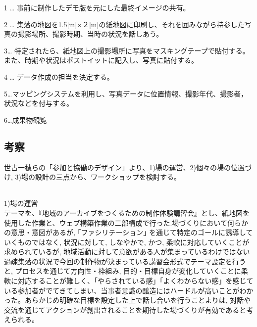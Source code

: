 \documentclass[a4paper]{jsarticle}
\begin{document}
\item 1 … 事前に制作したデモ版を元にした最終イメージの共有。
\item 2 … 集落の地図を1.5[m]×２[m]の紙地図に印刷し、それを囲みながら持参した写真の撮影場所、撮影時期、当時の状況を話しあう。


\item 3… 特定されたら、紙地図上の撮影場所に写真をマスキングテープで貼付する。また、時期や状況はポストイットに記入し、写真に貼付する。

\item 4 … データ作成の担当を決定する。

\item 5…マッピングシステムを利用し、写真データに位置情報、撮影年代、撮影者，状況などを付与する。
\item 6…成果物観覧
\subsection{考察}
世古一穂らの「参加と協働のデザイン」より、1)場の運営、2)個々の場の位置づけ, 3)場の設計の三点から、ワークショップを検討する。\\\\
\item 1)場の運営\\
テーマを、『地域のアーカイブをつくるための制作体験講習会』とし、紙地図を使用した作業と、ウェブ構築作業の二部構成で行った.場づくりにおいて何らかの意思・意図があるが, ｢ファシリテーション｣ を通じて特定のゴールに誘導していくものではなく, 状況に対して, しなやかで, かつ, 柔軟に対応していくことが求められているが, 地域活動に対して意欲がある人が集まっているわけではない過疎集落の状況で今回の制作物が決まっている講習会形式でテーマ設定を行うと,  プロセスを通じて方向性・枠組み, 目的・目標自身が変化していくことに柔軟に対応することが難しく、「やらされている感」「よくわからない感」を感じている参加者がでてきてしまい、当事者意識の醸造にはハードルが高いことがわかった。あらかじめ明確な目標を設定した上で話し合いを行うことよりは, 対話や交流を通じてアクションが創出されることを期待した場づくりが有効であると考えられる。
\end{document}
